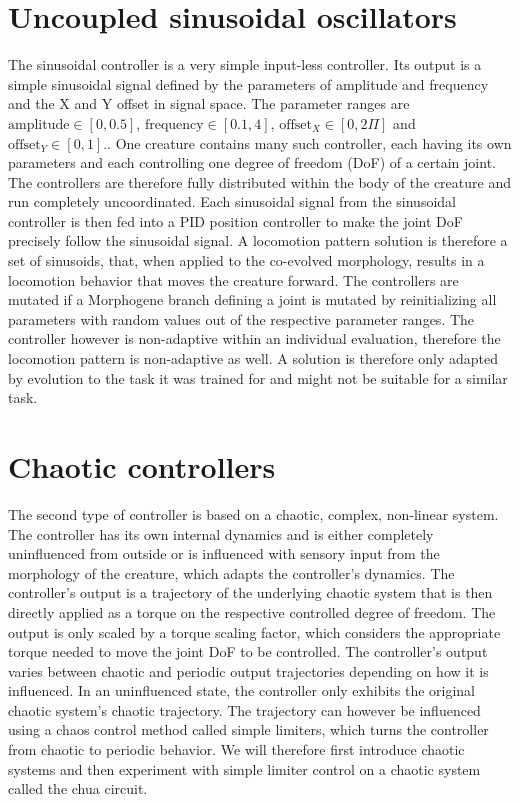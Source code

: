 \documentclass[main]{subfiles}
\begin{document}
\section{Uncoupled sinusoidal oscillators}
\label{sec:sinusoidal-oscillators}

The sinusoidal controller is a very simple input-less controller. Its output is a simple sinusoidal signal defined by the parameters of amplitude and frequency and the X and Y offset in signal space. The parameter ranges are $\text{amplitude} \in [0,0.5]$, $\text{frequency} \in [0.1,4]$, $\text{offset}_X \in [0,2\Pi]$ and $\text{offset}_Y \in [0,1]$.. One creature contains many such controller, each having its own parameters and each controlling one degree of freedom (DoF) of a certain joint. The controllers are therefore fully distributed within the body of the creature and run completely uncoordinated. Each sinusoidal signal from the sinusoidal controller is then fed into a PID position controller to make the joint DoF precisely follow the sinusoidal signal. A locomotion pattern solution is therefore a set of sinusoids, that, when applied to the co-evolved morphology, results in a locomotion behavior that moves the creature forward. The controllers are mutated if a Morphogene branch defining a joint is mutated by reinitializing all parameters with random values out of the respective parameter ranges. The controller however is non-adaptive within an individual evaluation, therefore the locomotion pattern is non-adaptive as well. A solution is therefore only adapted by evolution to the task it was trained for and might not be suitable for a similar task.

\section{Chaotic controllers}
\label{sec:chaotic-controllers}

The second type of controller is based on a chaotic, complex, non-linear system. The controller has its own internal dynamics and is either completely uninfluenced from outside or is influenced with sensory input from the morphology of the creature, which adapts the controller's dynamics. The controller's output is a trajectory of the underlying chaotic system that is then directly applied as a torque on the respective controlled degree of freedom. The output is only scaled by a torque scaling factor, which considers the appropriate torque needed to move the joint DoF to be controlled. The controller's output varies between chaotic and periodic output trajectories depending on how it is influenced. In an uninfluenced state, the controller only exhibits the original chaotic system's chaotic trajectory. The trajectory can however be influenced using a chaos control method called simple limiters, which turns the controller from chaotic to periodic behavior. We will therefore first introduce chaotic systems and then experiment with simple limiter control on a chaotic system called the chua circuit.
\end{document}
